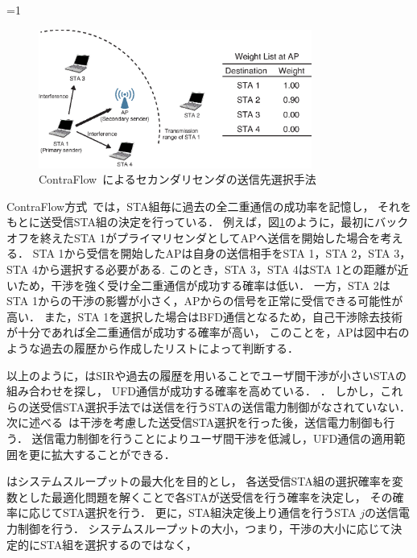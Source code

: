 \documentclass[master]{kuisthesis}		%
\newcounter{flagFig}
\begin{document}
			\par
			\ifnum\value{flagFig}=1 {\begin{figure}[htbp]
				\begin{center}
					\includegraphics[width=0.8\textwidth]{fig/contra.eps}
					\caption{ContraFlow~\cite{contra}によるセカンダリセンダの送信先選択手法}
					\label{fig:contra}
				\end{center}
			\end{figure}}\fi
			ContraFlow方式~\cite{contra}では，STA組毎に過去の全二重通信の成功率を記憶し，
			それをもとに送受信STA組の決定を行っている．
			例えば，図\ref{fig:contra}のように，最初にバックオフを終えたSTA 1がプライマリセンダとしてAPへ送信を開始した場合を考える．
			STA 1から受信を開始したAPは自身の送信相手をSTA 1，STA 2，STA 3，STA 4から選択する必要がある.
			このとき，STA 3，STA 4はSTA 1との距離が近いため，干渉を強く受け全二重通信が成功する確率は低い．
			一方，STA 2はSTA 1からの干渉の影響が小さく，APからの信号を正常に受信できる可能性が高い．
			また，STA 1を選択した場合はBFD通信となるため，自己干渉除去技術が十分であれば全二重通信が成功する確率が高い，
			このことを，APは図中右のような過去の履歴から作成したリストによって判断する．
			\par
			以上のように，\cite{goyal,contra}はSIRや過去の履歴を用いることでユーザ間干渉が小さいSTAの組み合わせを探し，
			UFD通信が成功する確率を高めている．
			．
			しかし，これらの送受信STA選択手法では送信を行うSTAの送信電力制御がなされていない．
			次に述べる~\cite{promac}は干渉を考慮した送受信STA選択を行った後，送信電力制御も行う．
			送信電力制御を行うことによりユーザ間干渉を低減し，UFD通信の適用範囲を更に拡大することができる．
			\par
			\cite{promac}はシステムスループットの最大化を目的とし，
			各送受信STA組の選択確率を変数とした最適化問題を解くことで各STAが送受信を行う確率を決定し，
			その確率に応じてSTA選択を行う．
			更に，STA組決定後上り通信を行うSTA $j$の送信電力制御を行う．
			システムスループットの大小，つまり，干渉の大小に応じて決定的にSTA組を選択するのではなく，
\end{document}
